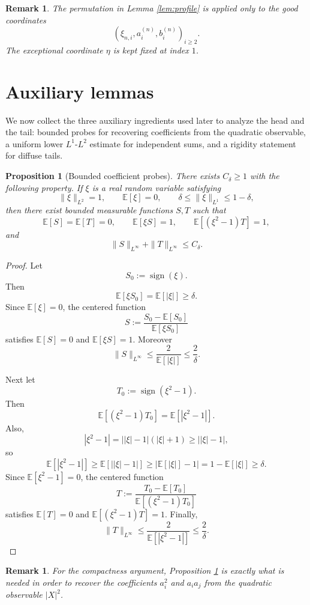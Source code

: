 \documentclass[11pt]{amsart}
\newtheorem{proposition}[theorem]{Proposition}
\newtheorem{remark}[theorem]{Remark}
\newcommand{\E}{\mathbb E}
\begin{document}
\begin{remark}
The permutation in Lemma \ref{lem:profile} is applied only to the good
coordinates
\[
(\xi_{n,i},a_i^{(n)},b_i^{(n)})_{i \ge 2}.
\]
The exceptional coordinate $\eta$ is kept fixed at index $1$.
\end{remark}

\section{Auxiliary lemmas}

We now collect the three auxiliary ingredients used later to analyze the head
and the tail: bounded probes for recovering coefficients from the quadratic
observable, a uniform lower $L^1$-$L^2$ estimate for independent sums, and a
rigidity statement for diffuse tails.

\begin{proposition}[Bounded coefficient probes]
\label{prop:bounded-probes}
There exists $C_\delta \ge 1$ with the following property. If $\xi$ is a real
random variable satisfying
\[
\|\xi\|_{L^2}=1,
\qquad
\E[\xi] = 0,
\qquad
\delta \le \|\xi\|_{L^1} \le 1-\delta,
\]
then there exist bounded measurable functions $S,T$ such that
\[
\E[S] = \E[T] = 0,
\qquad
\E[\xi S] = 1,
\qquad
\E[(\xi^2-1)T] = 1,
\]
and
\[
\|S\|_{L^\infty}
+ \|T\|_{L^\infty}
\le C_\delta.
\]
\end{proposition}

\begin{proof}
Let
\[
S_0 := \operatorname{sign}(\xi).
\]
Then
\[
\E[\xi S_0] = \E[|\xi|] \ge \delta.
\]
Since $\E[\xi] = 0$, the centered function
\[
S := \frac{S_0 - \E[S_0]}{\E[\xi S_0]}
\]
satisfies $\E[S]=0$ and $\E[\xi S]=1$. Moreover
\[
\|S\|_{L^\infty}
\le
\frac{2}{\E[|\xi|]}
\le
\frac{2}{\delta}.
\]

Next let
\[
T_0 := \operatorname{sign}(\xi^2-1).
\]
Then
\[
\E[(\xi^2-1)T_0] = \E[|\xi^2-1|].
\]
Also,
\[
|\xi^2-1|
=
\bigl||\xi|-1\bigr| (|\xi|+1)
\ge
\bigl||\xi|-1\bigr|,
\]
so
\[
\E[|\xi^2-1|]
\ge
\E[\bigl||\xi|-1\bigr|]
\ge
\bigl| \E[|\xi|] - 1 \bigr|
=
1-\E[|\xi|]
\ge
\delta.
\]
Since $\E[\xi^2-1]=0$, the centered function
\[
T := \frac{T_0 - \E[T_0]}{\E[(\xi^2-1)T_0]}
\]
satisfies $\E[T]=0$ and $\E[(\xi^2-1)T]=1$. Finally,
\[
\|T\|_{L^\infty}
\le
\frac{2}{\E[|\xi^2-1|]}
\le
\frac{2}{\delta}.
\]
\end{proof}

\begin{remark}
For the compactness argument, Proposition \ref{prop:bounded-probes} is exactly
what is needed in order to recover the coefficients $a_i^2$ and $a_i a_j$ from
the quadratic observable $|X|^2$.
\end{remark}
\end{document}
